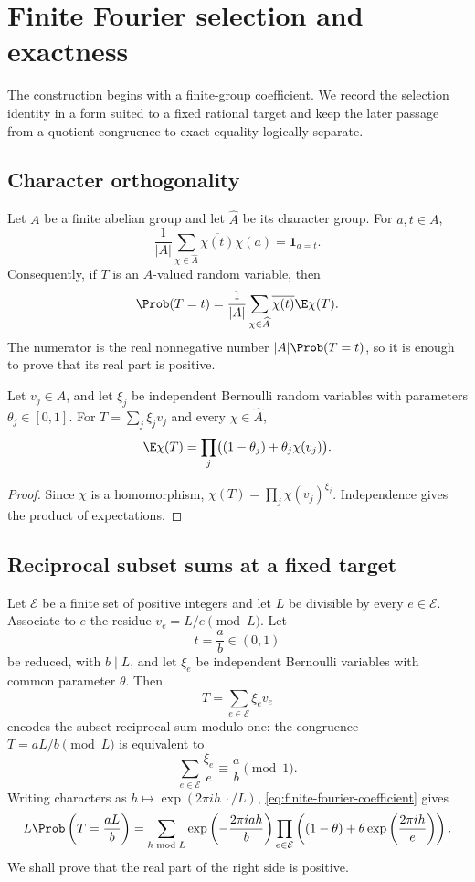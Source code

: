 \section{Finite Fourier selection and exactness}
\label{sec:fourier-selection}

The construction begins with a finite-group coefficient. We record the selection identity in a form suited to a fixed rational target and keep the later passage from a quotient congruence to exact equality logically separate.

\subsection{Character orthogonality}

Let $A$ be a finite abelian group and let $\widehat A$ be its character group. For $a,t\in A$,
\[
 \frac1{|A|}\sum_{\chi\in\widehat A}\overline{\chi(t)}\chi(a)=\mathbf 1_{a=t}.
\]
Consequently, if $T$ is an $A$-valued random variable, then
\begin{equation}
\label{eq:finite-fourier-coefficient}
 \Prob(T=t)=\frac1{|A|}\sum_{\chi\in\widehat A}\overline{\chi(t)}\E\chi(T).
\end{equation}
The numerator is the real nonnegative number $|A|\Prob(T=t)$, so it is enough to prove that its real part is positive.

\begin{lemma}
\label{lem:independent-product}
Let $v_j\in A$, and let $\xi_j$ be independent Bernoulli random variables with parameters $\theta_j\in[0,1]$. For $T=\sum_j\xi_jv_j$ and every $\chi\in\widehat A$,
\[
 \E\chi(T)=\prod_j\bigl((1-\theta_j)+\theta_j\chi(v_j)\bigr).
\]
\end{lemma}
\begin{proof}
Since $\chi$ is a homomorphism, $\chi(T)=\prod_j\chi(v_j)^{\xi_j}$. Independence gives the product of expectations.
\end{proof}

\subsection{Reciprocal subset sums at a fixed target}

Let $\mathcal E$ be a finite set of positive integers and let $L$ be divisible by every $e\in\mathcal E$. Associate to $e$ the residue $v_e=L/e\pmod L$. Let
\[
 t=\frac ab\in(0,1)
\]
be reduced, with $b\mid L$, and let $\xi_e$ be independent Bernoulli variables with common parameter $\theta$. Then
\[
 T=\sum_{e\in\mathcal E}\xi_ev_e
\]
encodes the subset reciprocal sum modulo one: the congruence $T=aL/b\pmod L$ is equivalent to
\[
 \sum_{e\in\mathcal E}\frac{\xi_e}{e}\equiv\frac ab\pmod1.
\]
Writing characters as $h\mapsto\exp(2\pi i h\,\cdot/L)$, \cref{eq:finite-fourier-coefficient} gives
\begin{equation}
\label{eq:reciprocal-fourier}
 L\Prob\left(T=\frac{aL}{b}\right)=\sum_{h\bmod L}\exp\left(-\frac{2\pi i a h}{b}\right)\prod_{e\in\mathcal E}\left((1-\theta)+\theta\exp\left(\frac{2\pi i h}{e}\right)\right).
\end{equation}
We shall prove that the real part of the right side is positive.

